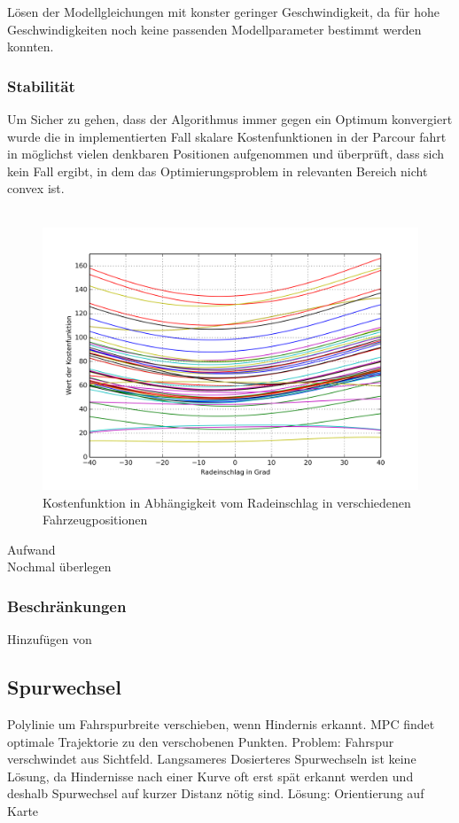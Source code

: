 Lösen der Modellgleichungen mit konster geringer Geschwindigkeit, da für hohe Geschwindigkeiten noch keine passenden Modellparameter bestimmt werden konnten.
\subsubsection{Stabilität}
Um Sicher zu gehen, dass der Algorithmus immer gegen ein Optimum konvergiert wurde die in implementierten Fall skalare Kostenfunktionen in der Parcour fahrt in möglichst vielen denkbaren Positionen aufgenommen und überprüft, dass sich kein Fall ergibt, in dem das Optimierungsproblem in relevanten Bereich nicht convex ist.
\\
\\
\begin{figure}[t]
\centering
\includegraphics[scale=0.75]{Bilder/Parabeln.png}
\caption{Kostenfunktion in Abhängigkeit vom Radeinschlag in verschiedenen Fahrzeugpositionen}
\end{figure}

Aufwand\\
Nochmal überlegen\\

\subsubsection{Beschränkungen}
Hinzufügen von ~
\subsection{Spurwechsel}
Polylinie um Fahrspurbreite verschieben, wenn Hindernis erkannt. MPC findet optimale Trajektorie zu den verschobenen Punkten. Problem: Fahrspur verschwindet aus Sichtfeld. Langsameres Dosierteres Spurwechseln ist keine Lösung, da Hindernisse nach einer Kurve oft erst spät erkannt werden und deshalb Spurwechsel auf kurzer Distanz nötig sind. Lösung: Orientierung auf Karte

